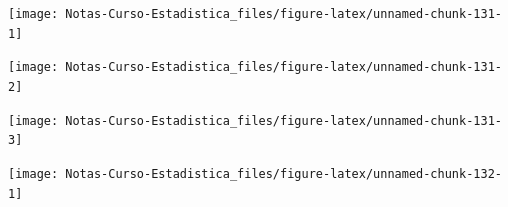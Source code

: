 \documentclass[
  12pt,
]{book}
\newenvironment{Shaded}{\begin{snugshade}}{\end{snugshade}}
\newcommand{\DataTypeTok}[1]{\textcolor[rgb]{0.13,0.29,0.53}{#1}}
\newcommand{\DecValTok}[1]{\textcolor[rgb]{0.00,0.00,0.81}{#1}}
\newcommand{\FloatTok}[1]{\textcolor[rgb]{0.00,0.00,0.81}{#1}}
\newcommand{\KeywordTok}[1]{\textcolor[rgb]{0.13,0.29,0.53}{\textbf{#1}}}
\newcommand{\NormalTok}[1]{#1}
\newcommand{\OperatorTok}[1]{\textcolor[rgb]{0.81,0.36,0.00}{\textbf{#1}}}
\newcommand{\StringTok}[1]{\textcolor[rgb]{0.31,0.60,0.02}{#1}}
\theoremstyle{definition}
\theoremstyle{definition}
\theoremstyle{definition}
\theoremstyle{remark}
\begin{document}
\begin{center}\texttt{[image: Notas-Curso-Estadistica\_files/figure-latex/unnamed-chunk-131-1]} \end{center}

\begin{Shaded}
\end{Shaded}

\begin{center}\texttt{[image: Notas-Curso-Estadistica\_files/figure-latex/unnamed-chunk-131-2]} \end{center}

\begin{Shaded}
\end{Shaded}

\begin{center}\texttt{[image: Notas-Curso-Estadistica\_files/figure-latex/unnamed-chunk-131-3]} \end{center}

\begin{Shaded}
\end{Shaded}

\begin{center}\texttt{[image: Notas-Curso-Estadistica\_files/figure-latex/unnamed-chunk-132-1]} \end{center}
\end{document}
